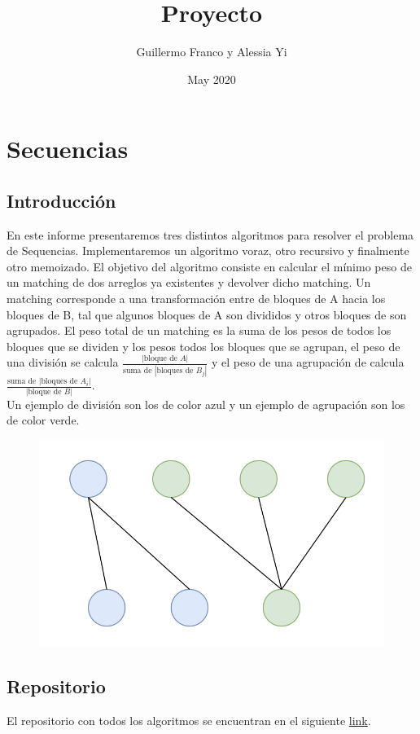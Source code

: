 \documentclass[12pt]{article}
\title{Proyecto}
\author{Guillermo Franco y Alessia Yi }
\date{May 2020}
\begin{document}
\maketitle

\section{Secuencias}
\subsection*{Introducción}
En este informe presentaremos tres distintos algoritmos para resolver el problema de Sequencias. Implementaremos un algoritmo voraz, otro recursivo y finalmente otro memoizado. El objetivo del algoritmo consiste en calcular el mínimo peso de un matching de dos arreglos ya existentes y devolver dicho matching. Un matching corresponde a una transformación entre de bloques de A hacia los bloques de B, tal que algunos bloques de A son divididos y otros bloques de son agrupados. El peso total de un matching es la suma de los pesos de todos los bloques que se dividen y los pesos todos los bloques que se agrupan, el peso de una división se calcula $\frac{|\text{bloque de }A|}{\text{suma de }|\text{bloques de }B_j|}$ y el peso de una agrupación de calcula $\frac{\text{suma de }|\text{bloques de }A_i|}{|\text{bloque de }B|}$.\\




Un ejemplo de división son los de color azul y un ejemplo de agrupación son los de color verde.
\begin{figure}[h]
\includegraphics[scale=0.7]{matching.png}
\centering
\end{figure}

\subsection*{Repositorio}
El repositorio con todos los algoritmos se encuentran en el siguiente \href{https://github.com/Guillermo598/ProyectoADA}{link}.




\end{document}
